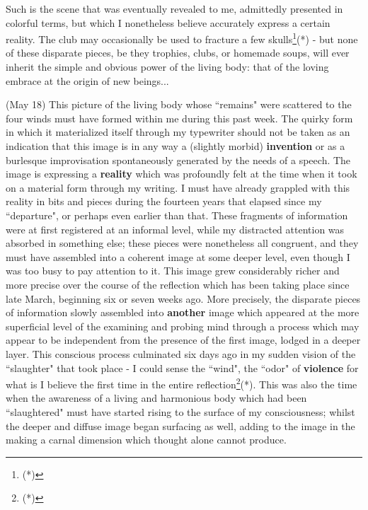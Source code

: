 Such is the scene that was eventually revealed to me, admittedly presented in colorful terms, but which I nonetheless believe accurately express a certain reality. The club may occasionally be used to fracture a few skulls\footnote{(*)}(*) - but none of these disparate pieces, be they trophies, clubs, or homemade soups, will ever inherit the simple and obvious power of the living body: that of the loving embrace at the origin of new beings...

(May 18) This picture of the living body whose ``remains" were scattered to the four winds must have formed within me during this past week. The quirky form in which it materialized itself through my typewriter should not be taken as an indication that this image is in any way a (slightly morbid) \textbf{invention} or as a burlesque improvisation spontaneously generated by the needs of a speech. The image is expressing a \textbf{reality} which was profoundly felt at the time when it took on a material form through my writing. I must have already grappled with this reality in bits and pieces during the fourteen years that elapsed since my ``departure", or perhaps even earlier than that. These fragments of information were at first registered at an informal level, while my distracted attention was absorbed in something else; these pieces were nonetheless all congruent, and they must have assembled into a coherent image at some deeper level, even though I was too busy to pay attention to it. This image grew considerably richer and more precise over the course of the reflection which has been taking place since late March, beginning six or seven weeks ago. More precisely, the disparate pieces of information slowly assembled into \textbf{another} image which appeared at the more superficial level of the examining and probing mind through a process which may appear to be independent from the presence of the first image, lodged in a deeper layer. This conscious process culminated six days ago in my sudden vision of the ``slaughter" that took place - I could sense the ``wind", the ``odor" of \textbf{violence} for what is I believe the first time in the entire reflection\footnote{(*)}(*). This was also the time when the awareness of a living and harmonious body which had been ``slaughtered" must have started rising to the surface of my consciousness; whilst the deeper and diffuse image began surfacing as well, adding to the image in the making a carnal dimension which thought alone cannot produce.

